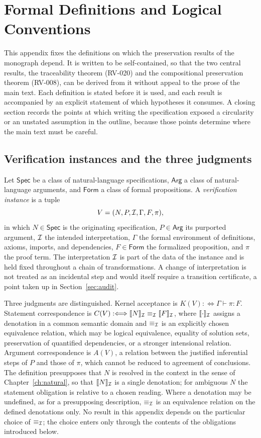 \chapter{Formal Definitions and Logical Conventions}
\label{app:formal}

This appendix fixes the definitions on which the preservation results of the monograph depend. It is written to be self-contained, so that the two central results, the traceability theorem (RV-020) and the compositional preservation theorem (RV-008), can be derived from it without appeal to the prose of the main text. Each definition is stated before it is used, and each result is accompanied by an explicit statement of which hypotheses it consumes. A closing section records the points at which writing the specification exposed a circularity or an unstated assumption in the outline, because those points determine where the main text must be careful.

\section{Verification instances and the three judgments}

Let $\mathsf{Spec}$ be a class of natural-language specifications, $\mathsf{Arg}$ a class of natural-language arguments, and $\mathsf{Form}$ a class of formal propositions. A \emph{verification instance} is a tuple
\[
V = (N, P, \mathcal{I}, \Gamma, F, \pi),
\]
in which $N \in \mathsf{Spec}$ is the originating specification, $P \in \mathsf{Arg}$ its purported argument, $\mathcal{I}$ the intended interpretation, $\Gamma$ the formal environment of definitions, axioms, imports, and dependencies, $F \in \mathsf{Form}$ the formalized proposition, and $\pi$ the proof term. The interpretation $\mathcal{I}$ is part of the data of the instance and is held fixed throughout a chain of transformations. A change of interpretation is not treated as an incidental step and would itself require a transition certificate, a point taken up in Section~\ref{sec:audit}.

Three judgments are distinguished. Kernel acceptance is $K(V) :\Longleftrightarrow \Gamma \vdash \pi : F$. Statement correspondence is $C(V) :\Longleftrightarrow \llbracket N \rrbracket_{\mathcal{I}} \equiv_{\mathcal{I}} \llbracket F \rrbracket_{\mathcal{I}}$, where $\llbracket\cdot\rrbracket_{\mathcal{I}}$ assigns a denotation in a common semantic domain and $\equiv_{\mathcal{I}}$ is an explicitly chosen equivalence relation, which may be logical equivalence, equality of solution sets, preservation of quantified dependencies, or a stronger intensional relation. Argument correspondence is $A(V)$, a relation between the justified inferential steps of $P$ and those of $\pi$, which cannot be reduced to agreement of conclusions. The definition presupposes that $N$ is resolved in the context in the sense of Chapter~\ref{ch:natural}, so that $\llbracket N\rrbracket_{\mathcal{I}}$ is a single denotation; for ambiguous $N$ the statement obligation is relative to a chosen reading. Where a denotation may be undefined, as for a presupposing description, $\equiv_{\mathcal{I}}$ is an equivalence relation on the defined denotations only. No result in this appendix depends on the particular choice of $\equiv_{\mathcal{I}}$; the choice enters only through the contents of the obligations introduced below.


